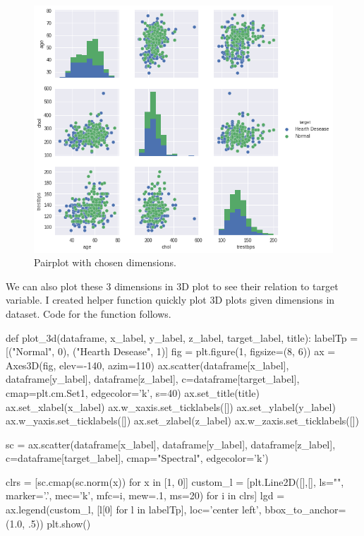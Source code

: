 \documentclass[12pt]{article}
\begin{document}
\begin{figure}[H]
    \centering
    \includegraphics[width=\textwidth]{img/pairplot.png}
    \caption{Pairplot with chosen dimensions.}
\end{figure}
 
We can also plot these 3 dimensions in 3D plot to see their relation to target variable. I created helper function quickly plot 3D plots given dimensions in dataset. Code for the function follows.

\begin{python}
    def plot_3d(dataframe, x_label, y_label, z_label, target_label, title):
        labelTp = [("Normal", 0), ("Hearth Desease", 1)]
        fig = plt.figure(1, figsize=(8, 6))
        ax = Axes3D(fig, elev=-140, azim=110)
        ax.scatter(dataframe[x_label], dataframe[y_label], dataframe[z_label], c=dataframe[target_label],
                    cmap=plt.cm.Set1, edgecolor='k', s=40)
        ax.set_title(title)
        ax.set_xlabel(x_label)
        ax.w_xaxis.set_ticklabels([])
        ax.set_ylabel(y_label)
        ax.w_yaxis.set_ticklabels([])
        ax.set_zlabel(z_label)
        ax.w_zaxis.set_ticklabels([])

        sc = ax.scatter(dataframe[x_label], dataframe[y_label], dataframe[z_label], c=dataframe[target_label], cmap="Spectral", edgecolor='k')

        clrs = [sc.cmap(sc.norm(x)) for x in [1, 0]]
        custom_l = [plt.Line2D([],[], ls="", marker='.', 
                        mec='k', mfc=i, mew=.1, ms=20) for i in clrs]
        lgd = ax.legend(custom_l, [l[0] for l in labelTp], 
                    loc='center left', bbox_to_anchor=(1.0, .5))
        plt.show()
\end{python}
\end{document}
